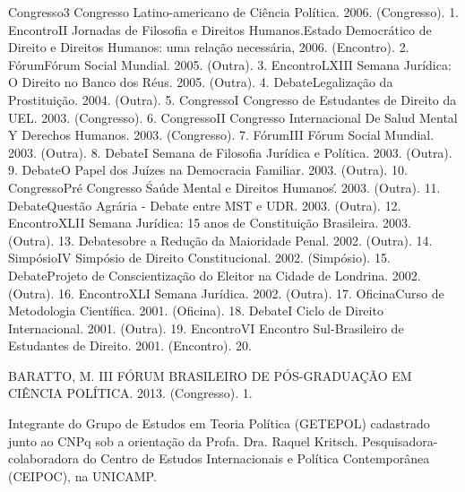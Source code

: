 

\begin{cvhonors}
  \cvhonor
    {Congresso}{3 Congresso Latino-americano de Ciência Política. 2006. (Congresso).}
    {}
    {1.}
  \cvhonor
    {Encontro}{II Jornadas de Filosofia e Direitos Humanos.Estado Democrático de Direito e Direitos Humanos: uma relação necessária, 2006. (Encontro).}
    {}
    {2.}
  \cvhonor
    {Fórum}{Fórum Social Mundial. 2005. (Outra).}
    {}
    {3.}
  \cvhonor
    {Encontro}{LXIII Semana Jurídica: O Direito no Banco dos Réus. 2005. (Outra).}
    {}
    {4.}
  \cvhonor
    {Debate}{Legalização da Prostituição. 2004. (Outra).}
    {}
    {5.}
  \cvhonor
    {Congresso}{I Congresso de Estudantes de Direito da UEL. 2003. (Congresso).}
    {}
    {6.}
  \cvhonor
    {Congresso}{II Congresso Internacional De Salud Mental Y Derechos Humanos. 2003. (Congresso).}
    {}
    {7.}
  \cvhonor
    {Fórum}{III Fórum Social Mundial. 2003. (Outra).}
    {}
    {8.}
  \cvhonor
    {Debate}{I Semana de Filosofia Jurídica e Política. 2003. (Outra).}
    {}
    {9.}
  \cvhonor
    {Debate}{O Papel dos Juízes na Democracia Familiar. 2003. (Outra).}
    {}
    {10.}
  \cvhonor
    {Congresso}{Pré Congresso \'Saúde Mental e Direitos Humanos\'. 2003. (Outra).}
    {}
    {11.}
  \cvhonor
    {Debate}{Questão Agrária - Debate entre MST e UDR. 2003. (Outra).}
    {}
    {12.}
  \cvhonor
    {Encontro}{XLII Semana Jurídica: 15 anos de Constituição Brasileira. 2003. (Outra).}
    {}
    {13.}
  \cvhonor
    {Debate}{sobre a Redução da Maioridade Penal. 2002. (Outra).}
    {}
    {14.}
  \cvhonor
    {Simpósio}{IV Simpósio de Direito Constitucional. 2002. (Simpósio).}
    {}
    {15.}
  \cvhonor
    {Debate}{Projeto de Conscientização do Eleitor na Cidade de Londrina. 2002. (Outra).}
    {}
    {16.}
  \cvhonor
    {Encontro}{XLI Semana Jurídica. 2002. (Outra).}
    {}
    {17.}
  \cvhonor
    {Oficina}{Curso de Metodologia Científica. 2001. (Oficina).}
    {}
    {18.}
  \cvhonor
    {Debate}{I Ciclo de Direito Internacional. 2001. (Outra).}
    {}
    {19.}
  \cvhonor
    {Encontro}{VI Encontro Sul-Brasileiro de Estudantes de Direito. 2001. (Encontro).}
    {}
    {20.}
\end{cvhonors}


\begin{cvhonors}
  \cvhonor
    {BARATTO, M.}
    {III FÓRUM BRASILEIRO DE PÓS-GRADUAÇÃO EM CIÊNCIA POLÍTICA. 2013. (Congresso).}
    {}
    {1. }
\end{cvhonors}


\begin{cvhonors}
  \cvhonor
    {Integrante do Grupo de Estudos em Teoria Política (GETEPOL)}
    {cadastrado junto ao CNPq sob a orientação da Profa. Dra. Raquel Kritsch. Pesquisadora-colaboradora do Centro de Estudos Internacionais e Política Contemporânea (CEIPOC), na UNICAMP.}
    {}
    {}
\end{cvhonors}
